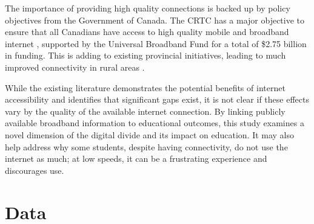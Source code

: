\documentclass[stu, floatsintext]{apa7}
\begin{document}
    The importance of providing high quality connections is backed up by policy objectives from the Government of Canada. The CRTC has a major objective to ensure that all Canadians have access to high quality mobile and broadband internet \autocite{radio2020broadband}, supported by the Universal Broadband Fund for a total of \$2.75 billion in funding. This is adding to existing provincial initiatives, leading to much improved connectivity in rural areas \autocite{rajabiun2013rural}.

    While the existing literature demonstrates the potential benefits of internet accessibility and identifies that significant gaps exist, it is not clear if these effects vary by the quality of the available internet connection. By linking publicly available broadband information to educational outcomes, this study examines a novel dimension of the digital divide and its impact on education. It may also help address why some students, despite having connectivity, do not use the internet as much; at low speeds, it can be a frustrating experience and discourages use. 
    \section{Data}
\end{document}
